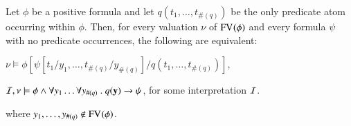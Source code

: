 \documentclass{llncs}
\begin{document}
\begin{proposition}\label{prop:subst}
  Let $\phi$ be a positive formula and let $q(t_1,\ldots,t_{\#(q)})$
  be the only predicate atom occurring within $\phi$. Then, for every
  valuation $\nu$ of $\mathrm{FV}_{}(\phi)$ and every formula $\psi$ with no
  predicate occurrences, the following are
  equivalent: \begin{compactenum}
  \item\label{it1:prop:subst} $\nu \models \phi[\psi[t_1/y_1, \ldots,
      t_{\#(q)}/y_{\#(q)}]/q(t_1,\ldots,t_{\#(q)})]$, 
  \item\label{it2:prop:subst} $\mathcal{I},\nu \models \phi \wedge \forall y_1
    \ldots \forall y_{\#(q)} ~.~ q(\mathbf y) \rightarrow
    \psi$, for some interpretation $\mathcal{I}$.
  \end{compactenum}
  where $y_1,\ldots,y_{\#(q)} \not\in \mathrm{FV}_{}(\phi)$. 
\end{proposition}
\end{document}
